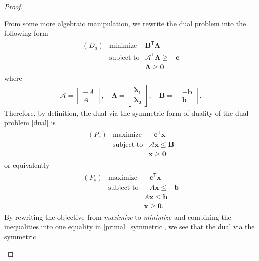 \documentclass[12pt]{article}
\theoremstyle{definition}
\newcommand{\vc}[1]{\boldsymbol{#1}}
\newcommand{\tran}{\mathsf{T}}
\begin{document}
\begin{proof}
\begin{enumerate}
      From some more algebraic manipulation, we rewrite the dual problem into the following form
      \begin{align}\label{dual}
        \begin{array}{lrl}
          (D_a) & \text{minimize} & \vc{B}^\tran\vc{\Lambda} \\
          & \text{subject to} & \mathscr{A}^\tran\vc{\Lambda} \geq -\vc{c} \\
          & & \vc{\Lambda} \geq \vc{0}
        \end{array}
      \end{align}
      where
      \begin{align*}
        \mathscr{A} = \begin{bmatrix}-A\\ A\end{bmatrix}, \quad \vc{\Lambda} = \begin{bmatrix}\vc{\lambda_1} \\ \vc{\lambda_2}\end{bmatrix},
        \quad \vc{B} = \begin{bmatrix}-\vc{b} \\ \vc{b}\end{bmatrix}.
      \end{align*}
      Therefore, by definition, the dual via the symmetric form of duality of the dual problem \eqref{dual} is
      \begin{align*}
        \begin{array}{lrl}
          (P_s) & \text{maximize} & -\vc{c}^\tran \vc{x} \\
          & \text{subject to} & \mathscr{A}\vc{x} \leq \vc{B}\\
          & & \vc{x}\geq \vc{0}
        \end{array}
      \end{align*}
      or equivalently
      \begin{align}\label{primal_symmetric}
        \begin{array}{lrl}
          (P_s) & \text{maximize} & -\vc{c}^\tran \vc{x} \\
          & \text{subject to} & -A\vc{x} \leq -\vc{b}\\
          & & A\vc{x} \leq \vc{b}\\
          & & \vc{x}\geq \vc{0}.
        \end{array}
      \end{align}
      By rewriting the objective from \textit{maximize} to \textit{minimize}
      and combining the inequalities into one equality in \eqref{primal_symmetric}, we see that the dual via the symmetric

\end{enumerate}
\end{proof}
\end{document}
